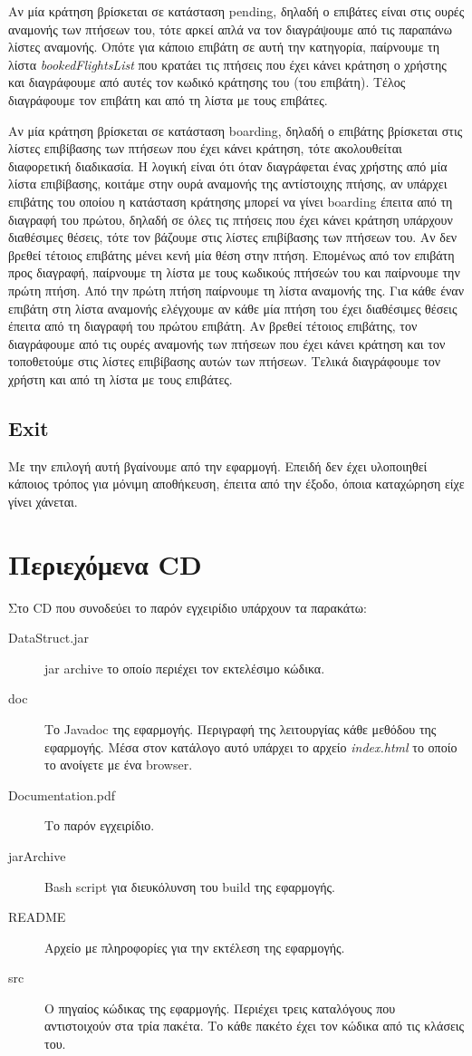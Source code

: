 \documentclass[a4paper]{article}
\begin{document}
Αν μία κράτηση βρίσκεται σε κατάσταση pending, δηλαδή ο επιβάτες είναι στις
ουρές αναμονής των πτήσεων του, τότε αρκεί απλά να τον διαγράψουμε από τις
παραπάνω λίστες αναμονής. Οπότε για κάποιο επιβάτη σε αυτή την κατηγορία,
παίρνουμε τη λίστα \emph{bookedFlightsList} που κρατάει τις πτήσεις που έχει
κάνει κράτηση ο χρήστης και διαγράφουμε από αυτές τον κωδικό κράτησης του (του
επιβάτη). Τέλος διαγράφουμε τον επιβάτη και από τη λίστα με τους επιβάτες.

Αν μία κράτηση βρίσκεται σε κατάσταση boarding, δηλαδή ο επιβάτης βρίσκεται στις
λίστες επιβίβασης των πτήσεων που έχει κάνει κράτηση, τότε ακολουθείται
διαφορετική διαδικασία. Η λογική είναι ότι όταν διαγράφεται ένας χρήστης από μία
λίστα επιβίβασης, κοιτάμε στην ουρά αναμονής της αντίστοιχης πτήσης, αν υπάρχει
επιβάτης του οποίου η κατάσταση κράτησης μπορεί να γίνει boarding έπειτα από τη
διαγραφή του πρώτου, δηλαδή σε όλες τις πτήσεις που έχει κάνει κράτηση υπάρχουν
διαθέσιμες θέσεις, τότε τον βάζουμε στις λίστες επιβίβασης των πτήσεων του. Αν
δεν βρεθεί τέτοιος επιβάτης μένει κενή μία θέση στην πτήση. Επομένως από τον
επιβάτη προς διαγραφή, παίρνουμε τη λίστα με τους κωδικούς πτήσεών του και
παίρνουμε την πρώτη πτήση. Από την πρώτη πτήση παίρνουμε τη λίστα αναμονής της.
Για κάθε έναν επιβάτη στη λίστα αναμονής ελέγχουμε αν κάθε μία πτήση του έχει
διαθέσιμες θέσεις έπειτα από τη διαγραφή του πρώτου επιβάτη. Αν βρεθεί τέτοιος
επιβάτης, τον διαγράφουμε από τις ουρές αναμονής των πτήσεων που έχει κάνει
κράτηση και τον τοποθετούμε στις λίστες επιβίβασης αυτών των πτήσεων. Τελικά
διαγράφουμε τον χρήστη και από τη λίστα με τους επιβάτες.
\subsection{Exit}
Με την επιλογή αυτή βγαίνουμε από την εφαρμογή. Επειδή δεν έχει υλοποιηθεί
κάποιος τρόπος για μόνιμη αποθήκευση, έπειτα από την έξοδο, όποια καταχώρηση
είχε γίνει χάνεται.
\section{Περιεχόμενα CD}
Στο CD που συνοδεύει το παρόν εγχειρίδιο υπάρχουν τα παρακάτω:
\begin{description}
\item[DataStruct.jar] jar archive το οποίο περιέχει τον εκτελέσιμο κώδικα.
\item[doc] Το Javadoc της εφαρμογής. Περιγραφή της λειτουργίας κάθε μεθόδου της
εφαρμογής. Μέσα στον κατάλογο αυτό υπάρχει το αρχείο \emph{index.html} το οποίο
το ανοίγετε με ένα browser.
\item[Documentation.pdf] Το παρόν εγχειρίδιο.
\item[jarArchive] Bash script για διευκόλυνση του build της εφαρμογής.
\item[README] Αρχείο με πληροφορίες για την εκτέλεση της εφαρμογής.
\item[src] Ο πηγαίος κώδικας της εφαρμογής. Περιέχει τρεις καταλόγους που
αντιστοιχούν στα τρία πακέτα. Το κάθε πακέτο έχει τον κώδικα από τις κλάσεις
του.
\end{description}
\end{document}
